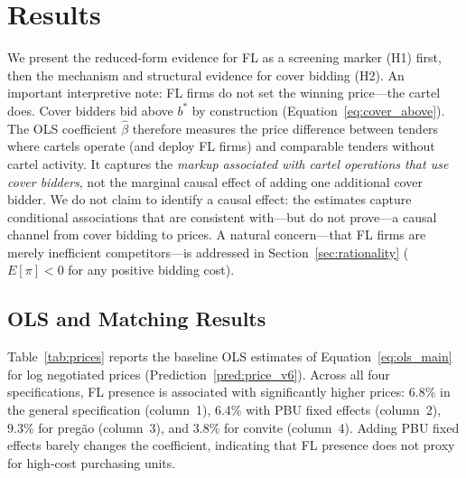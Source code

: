 
\section{Results}
\label{sec:results}

We present the reduced-form evidence for FL as a screening marker (H1)
first, then the mechanism and structural evidence for cover bidding
(H2). An important interpretive note: FL firms do not set the winning
price---the cartel does. Cover bidders bid above $b^*$ by construction
(Equation~\ref{eq:cover_above}). The OLS coefficient $\hat{\beta}$
therefore measures the price difference between tenders where cartels
operate (and deploy FL firms) and comparable tenders without cartel
activity. It captures the \emph{markup associated with cartel
operations that use cover bidders}, not the marginal causal effect of
adding one additional cover bidder. We do not claim to identify a
causal effect: the estimates capture conditional associations that are
consistent with---but do not prove---a causal channel from cover
bidding to prices. A natural concern---that FL firms are merely
inefficient competitors---is addressed in
Section~\ref{sec:rationality} ($E[\pi] < 0$ for any positive bidding
cost).


\subsection{OLS and Matching Results}
\label{sec:results_ols}

Table~\ref{tab:prices} reports the baseline OLS estimates of
Equation~\eqref{eq:ols_main} for log negotiated prices
(Prediction~\ref{pred:price_v6}). Across all four
specifications, FL presence is associated with significantly higher
prices: 6.8\% in the general specification (column~1), 6.4\% with PBU
fixed effects (column~2), 9.3\% for preg\~ao (column~3), and 3.8\% for
convite (column~4). Adding PBU fixed effects barely changes the
coefficient, indicating that FL presence does not proxy for high-cost
purchasing units.

